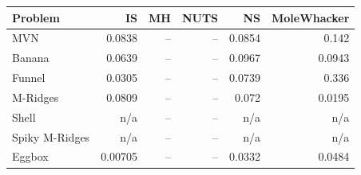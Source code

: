 \begin{tabular}{lrrrrr}
\toprule
Problem & IS & MH & NUTS & NS & MoleWhacker \\
\midrule
MVN & 0.0838 & -- & -- & 0.0854 & 0.142 \\
Banana & 0.0639 & -- & -- & 0.0967 & 0.0943 \\
Funnel & 0.0305 & -- & -- & 0.0739 & 0.336 \\
M-Ridges & 0.0809 & -- & -- & 0.072 & 0.0195 \\
Shell & n/a & -- & -- & n/a & n/a \\
Spiky M-Ridges & n/a & -- & -- & n/a & n/a \\
\midrule
Eggbox & 0.00705 & -- & -- & 0.0332 & 0.0484 \\
\bottomrule
\end{tabular}

